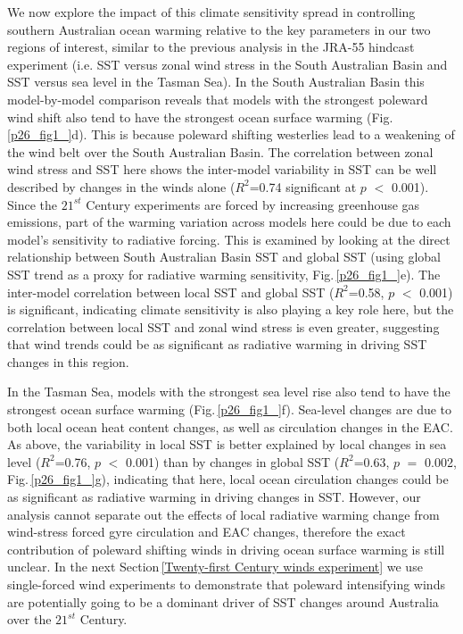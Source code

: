 \documentclass[draft,linenumbers]{agujournal2018}
\begin{document}
We now explore the impact of this climate sensitivity spread in controlling southern Australian ocean warming relative to the key parameters in our two regions of interest, similar to the previous analysis in the JRA-55 hindcast experiment (i.e. SST versus zonal wind stress in the South Australian Basin and SST versus sea level in the Tasman Sea). In the South Australian Basin this model-by-model comparison reveals that models with the strongest poleward wind shift also tend to have the strongest ocean surface warming (Fig.\,\ref{p26_fig1_}d). This is because poleward shifting westerlies lead to a weakening of the wind belt over the South Australian Basin. The correlation between zonal wind stress and SST here shows the inter-model variability in SST can be well described by changes in the winds alone ($R^2$=0.74 significant at $p$ $<$ 0.001). Since the $21^{st}$ Century experiments are forced by increasing greenhouse gas emissions, part of the warming variation across models here could be due to each model's sensitivity to radiative forcing. This is examined by looking at the direct relationship between South Australian Basin SST and global SST (using global SST trend as a proxy for radiative warming sensitivity, Fig.\,\ref{p26_fig1_}e). The inter-model correlation between local SST and global SST ($R^2$=0.58, $p$ $<$ 0.001) is significant, indicating climate sensitivity is also playing a key role here, but the correlation between local SST and zonal wind stress is even greater, suggesting that wind trends could be as significant as radiative warming in driving SST changes in this region.

In the Tasman Sea, models with the strongest sea level rise also tend to have the strongest ocean surface warming (Fig.\,\ref{p26_fig1_}f). Sea-level changes are due to both local ocean heat content changes, as well as circulation changes in the EAC. As above, the variability in local SST is better explained by local changes in sea level ($R^2$=0.76, $p$ $<$ 0.001) than by changes in global SST ($R^2$=0.63, $p$ $=$ 0.002, Fig.\,\ref{p26_fig1_}g), indicating that here, local ocean circulation changes could be as significant as radiative warming in driving changes in SST. However, our analysis cannot separate out the effects of local radiative warming change from wind-stress forced gyre circulation and EAC changes, therefore the exact contribution of poleward shifting winds in driving ocean surface warming is still unclear. In the next Section\,\ref{Twenty-first Century winds experiment} we use single-forced wind experiments to demonstrate that poleward intensifying winds are potentially going to be a dominant driver of SST changes around Australia over the $21^{st}$ Century.
\end{document}
